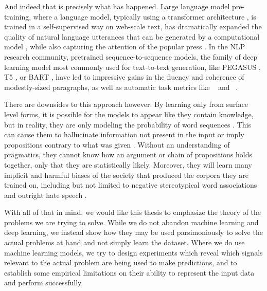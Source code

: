 And indeed that is precisely what has happened. Large language model
pre-training, where a language model, typically using a transformer
architecture \citep{vaswani2017}, is trained in a self-supervised way on
web-scale text, has dramatically expanded the quality of natural language
utterances that can be generated by a computational model
\citep{radford2019,brown2020}, while also capturing the attention of the
popular press \citep{simonite2019,vincent2019}. In the NLP research community,
pretrained sequence-to-sequence models, the family of deep learning model most
commonly used for text-to-text generation, like PEGASUS \citep{zhang2019}, T5
\citep{raffel2020}, or BART \citep{lewis2020}, have led to impressive gains in
the fluency and coherence of modestly-sized paragraphs, as well as automatic
task metrics like \bleu~\citep{papineni2002} and \rouge~\citep{lin2004}.

There are downsides to this approach however. By learning only from
surface level forms, it is possible for the models to appear like they contain
knowledge, but in reality, they are only modeling the probability of word sequences \citep{bender2020}. This can cause them to hallucinate information not present in the input or imply propositions contrary to what was given 
\citep{wiseman2017,kryscinski2019,maynez2020,kryscinski2020}.
Without an understanding of pragmatics, they cannot know how an argument
or chain of propositions
holds together, only that they are statistically likely.
Moreover, they will learn many implicit and harmful biases of the
society that produced the corpora they are trained on, including but 
not limited to negative stereotypical word associations \citep{bolukbasi2016,nissim2020} and outright 
hate speech \citep{lee2016}.

With all of that in mind, we would like this thesis to emphasize the theory
of the problems we are trying to solve. While we do not abandon
 machine learning
and deep learning, we instead show how they may be used parsimoniously to solve
the actual problems at hand and not simply learn the dataset. Where we 
do use machine learning models, we try to design experiments which 
reveal which signals 
relevant to the actual problem are being used to make predictions, and 
to establish some empirical limitations on their ability to represent 
the input data and perform successfully. 
 
